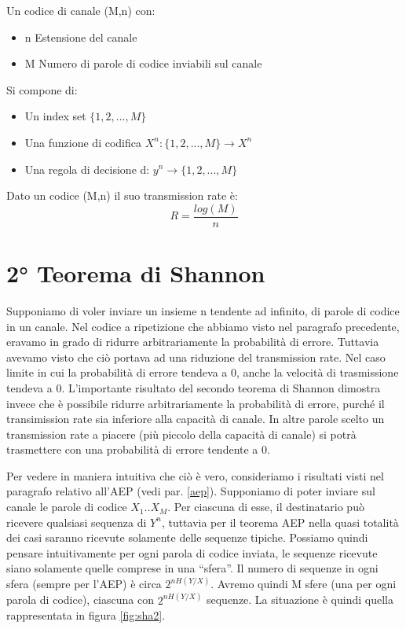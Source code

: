 \begin{definizione}
Un codice di canale (M,n) con:
\begin{itemize}
 \item n Estensione del canale
 \item M Numero di parole di codice inviabili sul canale
\end{itemize}
Si compone di:
\begin{itemize}
 \item Un index set $\{1,2,...,M\}$
 \item Una funzione di codifica $X^n: \{1,2,...,M\} \to X^n$
 \item Una regola di decisione d: $y^n \to \{1,2,...,M\}$
\end{itemize}

\end{definizione}

\begin{osservazione}
 Dato un codice (M,n) il suo transmission rate è:
\[
 R=\frac{log(M)}{n}
\]

\end{osservazione}

\section{2° Teorema di Shannon}
Supponiamo di voler inviare un insieme n tendente ad infinito, di parole di codice in un canale. Nel codice a ripetizione che abbiamo visto nel paragrafo precedente, eravamo in grado di ridurre arbitrariamente la probabilità di errore. Tuttavia avevamo visto che ciò 
portava ad una riduzione del transmission rate. Nel caso limite in cui la probabilità di errore tendeva a 0, anche la velocità di trasmissione tendeva a 0.
L'importante risultato del secondo teorema di Shannon dimostra invece che è possibile ridurre arbitrariamente la probabilità di errore, 
purché il transimission rate sia inferiore alla capacità di canale. In altre parole scelto un transmission rate a piacere (più piccolo della capacità di canale) si potrà trasmettere con una probabilità di errore tendente a 0.

Per vedere in maniera intuitiva che ciò è vero, consideriamo i risultati visti nel paragrafo relativo all'AEP (vedi par. \ref{aep}).
Supponiamo di poter inviare sul canale le parole di codice $X_1..X_M$. Per ciascuna di esse, il destinatario può ricevere qualsiasi 
sequenza di $Y^n$, tuttavia per il teorema AEP nella quasi totalità dei casi saranno ricevute solamente delle sequenze tipiche.
Possiamo quindi pensare intuitivamente per ogni parola di codice inviata, le sequenze ricevute siano solamente quelle comprese in una 
``sfera''. Il numero di sequenze in ogni sfera (sempre per l'AEP) è circa $2^{n H(Y/X)}$. Avremo quindi M sfere (una per ogni parola di codice), ciascuna con $2^{n H(Y/X)}$ sequenze. La situazione è quindi quella rappresentata in figura \ref{fig:sha2}.

